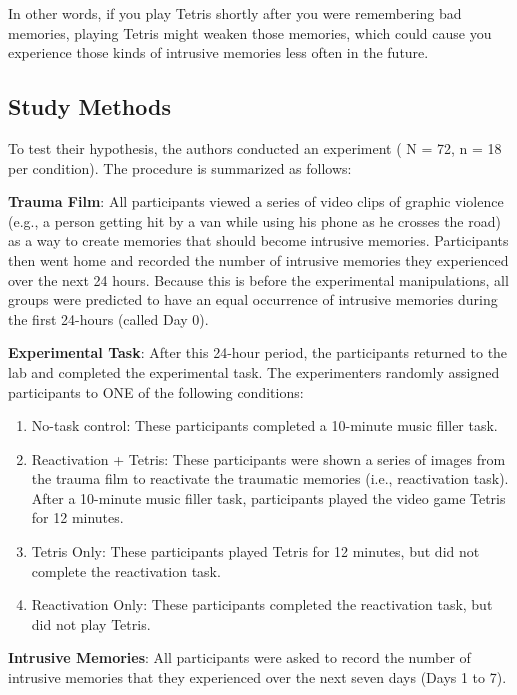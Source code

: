\documentclass[]{book}
\providecommand{\tightlist}{%
  \setlength{\itemsep}{0pt}\setlength{\parskip}{0pt}}
\begin{document}
In other words, if you play Tetris shortly after you were remembering
bad memories, playing Tetris might weaken those memories, which could
cause you experience those kinds of intrusive memories less often in the
future.

\subsection{Study Methods}\label{study-methods}

To test their hypothesis, the authors conducted an experiment ( N = 72,
n = 18 per condition). The procedure is summarized as follows:

\textbf{Trauma Film}: All participants viewed a series of video clips of
graphic violence (e.g., a person getting hit by a van while using his
phone as he crosses the road) as a way to create memories that should
become intrusive memories. Participants then went home and recorded the
number of intrusive memories they experienced over the next 24 hours.
Because this is before the experimental manipulations, all groups were
predicted to have an equal occurrence of intrusive memories during the
first 24-hours (called Day 0).

\textbf{Experimental Task}: After this 24-hour period, the participants
returned to the lab and completed the experimental task. The
experimenters randomly assigned participants to ONE of the following
conditions:

\begin{enumerate}
\def\labelenumi{\arabic{enumi}.}
\tightlist
\item
  No-task control: These participants completed a 10-minute music filler
  task.
\item
  Reactivation + Tetris: These participants were shown a series of
  images from the trauma film to reactivate the traumatic memories
  (i.e., reactivation task). After a 10-minute music filler task,
  participants played the video game Tetris for 12 minutes.
\item
  Tetris Only: These participants played Tetris for 12 minutes, but did
  not complete the reactivation task.
\item
  Reactivation Only: These participants completed the reactivation task,
  but did not play Tetris.
\end{enumerate}

\textbf{Intrusive Memories}: All participants were asked to record the
number of intrusive memories that they experienced over the next seven
days (Days 1 to 7).
\end{document}
